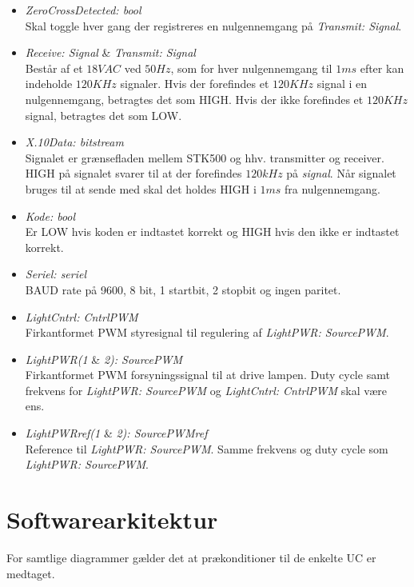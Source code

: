 \begin{itemize}
\item \emph{ZeroCrossDetected: bool} \\
Skal toggle hver gang der registreres en nulgennemgang på \emph{Transmit: Signal}.

\item \emph{Receive: Signal} \& \emph{Transmit: Signal} \\
Består af et $18 VAC$ ved $50 Hz$, som for hver nulgennemgang til $1 ms$ efter kan indeholde $120 KHz$ signaler. Hvis der forefindes et $120 KHz$ signal i en nulgennemgang, betragtes det som HIGH. Hvis der ikke forefindes et $120 KHz$ signal, betragtes det som LOW.

\item \emph{X.10Data: bitstream} \\
Signalet er grænsefladen mellem STK500 og hhv. transmitter og receiver. HIGH på signalet svarer til at der forefindes $120 kHz$ på \emph{signal}. Når signalet bruges til at sende med skal det holdes HIGH i $1 ms$ fra nulgennemgang.

\item \emph{Kode: bool} \\
Er LOW hvis koden er indtastet korrekt og HIGH hvis den ikke er indtastet korrekt.

\item \emph{Seriel: seriel} \\
BAUD rate på 9600, 8 bit, 1 startbit, 2 stopbit og ingen paritet.

\item \emph{LightCntrl: CntrlPWM} \\
Firkantformet PWM styresignal til regulering af \emph{LightPWR: SourcePWM}.

\item \emph{LightPWR(1} \& \emph{2): SourcePWM} \\
Firkantformet PWM forsyningssignal til at drive lampen. Duty cycle samt frekvens for \emph{LightPWR: SourcePWM} og \emph{LightCntrl: CntrlPWM} skal være ens.

\item \emph{LightPWRref(1} \& \emph{2): SourcePWMref} \\
Reference til \emph{LightPWR: SourcePWM}. Samme frekvens og duty cycle som \emph{LightPWR: SourcePWM}.
\end{itemize}


\section{Softwarearkitektur}
For samtlige diagrammer gælder det at prækonditioner til de enkelte UC er medtaget.

